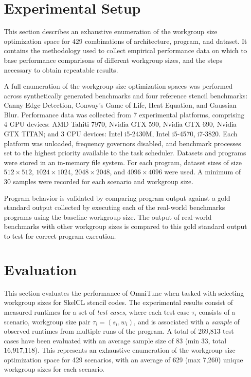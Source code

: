 \documentclass[nonatbib,preprint,nocopyrightspace,9pt]{sigplanconf}
\begin{document}
\section{Experimental Setup}

This section describes an exhaustive enumeration of the workgroup size
optimization space for 429 combinations of architecture, program, and
dataset. It contains the methodology used to collect empirical
performance data on which to base performance comparisons of different
workgroup sizes, and the steps necessary to obtain repeatable results.

A full enumeration of the workgroup size optimization spaces was
performed across synthetically generated benchmarks and four reference
stencil benchmarks: Canny Edge Detection, Conway's Game of Life, Heat
Equation, and Gaussian Blur. Performance data was collected from 7
experimental platforms, comprising 4 GPU devices: AMD Tahiti 7970,
Nvidia GTX 590, Nvidia GTX 690, Nvidia GTX TITAN; and 3 CPU devices:
Intel i5-2430M, Intel i5-4570, i7-3820. Each platform was unloaded,
frequency governors disabled, and benchmark processes set to the
highest priority available to the task scheduler. Datasets and
programs were stored in an in-memory file system. For each program,
dataset sizes of size $512\times512$, $1024\times1024$,
$2048\times2048$, and $4096\times4096$ were used. A minimum of 30
samples were recorded for each scenario and workgroup size.

Program behavior is validated by comparing program output against a
gold standard output collected by executing each of the real-world
benchmarks programs using the baseline workgroup size. The output of
real-world benchmarks with other workgroup sizes is compared to this
gold standard output to test for correct program execution.


\section{Evaluation}\label{sec:evaluation}

This section evaluates the performance of OmniTune when tasked with
selecting workgroup sizes for SkelCL stencil codes. The experimental
results consist of measured runtimes for a set of \emph{test cases},
where each test case $\tau_i$ consists of a scenario, workgroup size
pair $\tau_i = (s_i,w_i)$, and is associated with a \emph{sample} of
observed runtimes from multiple runs of the program. A total of
269,813 test cases have been evaluated with an average sample size of
83 (min 33, total 16,917,118). This represents an exhaustive
enumeration of the workgroup size optimization space for 429
scenarios, with an average of 629 (max 7,260) unique workgroup sizes
for each scenario.
\end{document}
